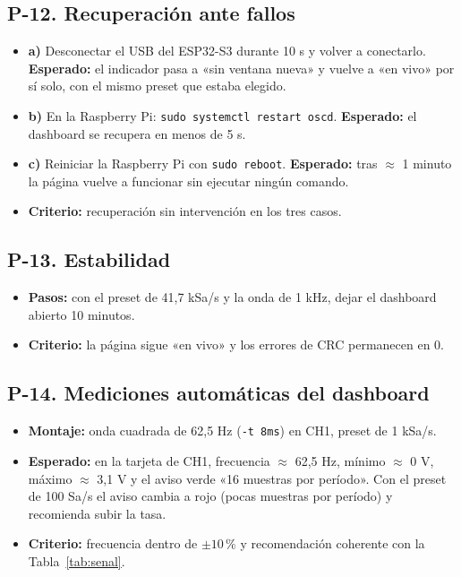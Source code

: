 \documentclass[12pt,a4paper]{article}
\begin{document}
\subsection*{P-12. Recuperación ante fallos}
\begin{itemize}
  \item \textbf{a)} Desconectar el USB del ESP32-S3 durante 10 s y volver a conectarlo. \textbf{Esperado:} el indicador pasa a «sin ventana nueva» y vuelve a «en vivo» por sí solo, con el mismo preset que estaba elegido.
  \item \textbf{b)} En la Raspberry Pi: \texttt{sudo systemctl restart oscd}. \textbf{Esperado:} el dashboard se recupera en menos de 5 s.
  \item \textbf{c)} Reiniciar la Raspberry Pi con \texttt{sudo reboot}. \textbf{Esperado:} tras $\approx$ 1 minuto la página vuelve a funcionar sin ejecutar ningún comando.
  \item \textbf{Criterio:} recuperación sin intervención en los tres casos.
\end{itemize}

\subsection*{P-13. Estabilidad}
\begin{itemize}
  \item \textbf{Pasos:} con el preset de 41{,}7 kSa/s y la onda de 1 kHz, dejar el dashboard abierto 10 minutos.
  \item \textbf{Criterio:} la página sigue «en vivo» y los errores de CRC permanecen en 0.
\end{itemize}

\subsection*{P-14. Mediciones automáticas del dashboard}
\begin{itemize}
  \item \textbf{Montaje:} onda cuadrada de 62{,}5 Hz (\texttt{-t 8ms}) en CH1, preset de 1 kSa/s.
  \item \textbf{Esperado:} en la tarjeta de CH1, frecuencia $\approx$ 62{,}5 Hz, mínimo $\approx$ 0 V, máximo $\approx$ 3{,}1 V y el aviso verde «16 muestras por período». Con el preset de 100 Sa/s el aviso cambia a rojo (pocas muestras por período) y recomienda subir la tasa.
  \item \textbf{Criterio:} frecuencia dentro de $\pm 10\,\%$ y recomendación coherente con la Tabla~\ref{tab:senal}.
\end{itemize}
\end{document}

